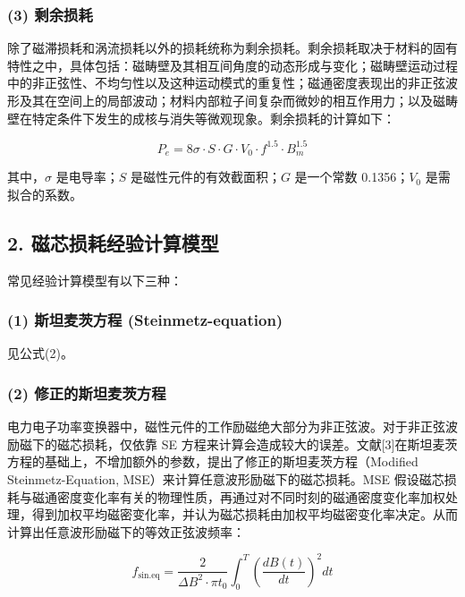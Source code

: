 \documentclass[a4paper,12pt]{ctexart}
\begin{document}
\subsubsection{(3) 剩余损耗}

除了磁滞损耗和涡流损耗以外的损耗统称为剩余损耗。剩余损耗取决于材料的固有特性之中，具体包括：磁畴壁及其相互间角度的动态形成与变化；磁畴壁运动过程中的非正弦性、不均匀性以及这种运动模式的重复性；磁通密度表现出的非正弦波形及其在空间上的局部波动；材料内部粒子间复杂而微妙的相互作用力；以及磁畴壁在特定条件下发生的成核与消失等微观现象。剩余损耗的计算如下：

\begin{equation}
P_e = 8\sigma \cdot S \cdot G \cdot V_0 \cdot f^{1.5} \cdot B_m^{1.5}
\end{equation}

其中，$\sigma$ 是电导率；$S$ 是磁性元件的有效截面积；$G$ 是一个常数 0.1356；$V_0$ 是需拟合的系数。

\subsection{2. 磁芯损耗经验计算模型}

常见经验计算模型有以下三种：

\subsubsection{(1) 斯坦麦茨方程 (Steinmetz-equation)}

见公式(2)。

\subsubsection{(2) 修正的斯坦麦茨方程}

电力电子功率变换器中，磁性元件的工作励磁绝大部分为非正弦波。对于非正弦波励磁下的磁芯损耗，仅依靠 SE 方程来计算会造成较大的误差。文献[3]在斯坦麦茨方程的基础上，不增加额外的参数，提出了修正的斯坦麦茨方程（Modified Steinmetz-Equation, MSE）来计算任意波形励磁下的磁芯损耗。MSE 假设磁芯损耗与磁通密度变化率有关的物理性质，再通过对不同时刻的磁通密度变化率加权处理，得到加权平均磁密变化率，并认为磁芯损耗由加权平均磁密变化率决定。从而计算出任意波形励磁下的等效正弦波频率：

\begin{equation}
f_{\text{sin.eq}} = \frac{2}{\Delta B^2 \cdot \pi t_0} \int_0^T \left( \frac{dB(t)}{dt} \right)^2 dt
\end{equation}
\end{document}
